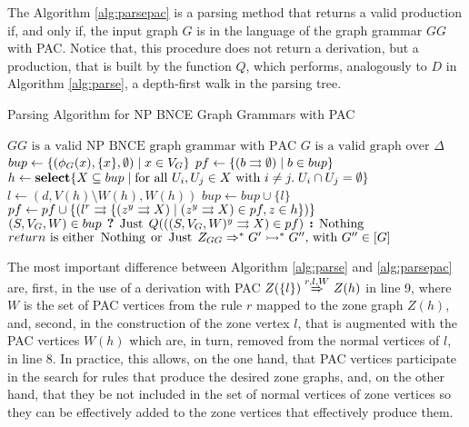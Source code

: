 The Algorithm \ref{alg:parsepac} is a parsing method that returns a valid production if, and only if, the input graph $G$ is in the language of the graph grammar $GG$ with PAC. Notice that, this procedure does not return a derivation, but a production, that is built by the function $Q$, which performs, analogously to $D$ in Algorithm \ref{alg:parse}, a depth-first walk in the parsing tree.

\begin{algorithm}[!h]
	\caption{Parsing Algorithm for NP BNCE Graph Grammars with PAC}
	\begin{algorithmic}[1]
		\Require $GG \text{ is a valid NP BNCE graph grammar with PAC}$
		\Require $G \text{ is a valid graph over } \Delta$
		\State $bup \gets \{(\phi_G(x),\{x\},\emptyset) \; | \; x \in V_G\}$
		\State $pf \gets \{ \ptree{b}{}{\emptyset} \st b \in bup \}$
		\Repeat
			\State $h \gets \text{\textbf{select}} \{X \subseteq bup \; | \;\text{for all } U_i, U_j \in X \text{ with } i \neq j . \; U_i \cap U_j = \emptyset \}$
					\State $l \gets (d,V(h)\setminus W(h), W(h))$ 
					 
					\State $bup \gets bup \cup \{l\}$
					\State $pf \gets pf \cup \{ \ptree{l}{r}{\{\ptree{z}{y}{X} \st \ptree{z}{y}{X} \in pf, z \in h \}} \}$
					\EndIf
				\EndFor
			\EndFor
		 
		\State \Return $(S, V_G, W) \in bup \? \Just Q(\ptree{(S,V_G, W)}{y}{X} \in pf) \: \Nothing $
		\EndFunction
		\Ensure $return \text{ is either } \operatorname{\text{Nothing}}\; \text{or } \operatorname{\text{Just}}\; Z_{GG} \Rightarrow^*_{} G' \rightarrowtail^* G'' \text{, with } G'' \in [G]$
	\end{algorithmic}
	\label{alg:parsepac}
\end{algorithm}

The most important difference between Algorithm \ref{alg:parse} and \ref{alg:parsepac} are, first, in the use of a derivation with PAC $Z(\{l\}) \derivpac{r}{l}{W}{} Z(h)$ in line 9, where $W$ is the set of PAC vertices from the rule $r$ mapped to the zone graph $Z(h)$, and, second, in the construction of the zone vertex $l$, that is augmented with the PAC vertices $W(h)$ which are, in turn, removed from the normal vertices of $l$, in line 8. In practice, this allows, on the one hand, that PAC vertices participate in the search for rules that produce the desired zone graphs, and, on the other hand, that they be not included in the set of normal vertices of zone vertices so they can be effectively added to the zone vertices that effectively produce them.

